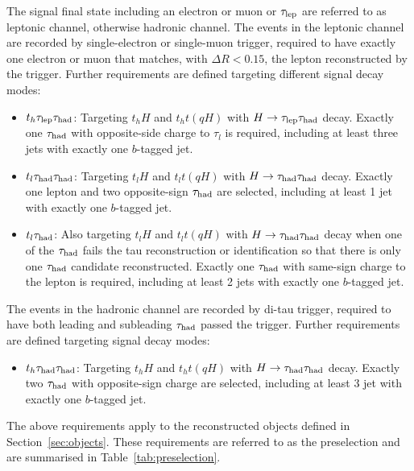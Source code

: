The signal final state including an electron or muon or $\tau_{\mathrm{lep}}$ are referred to as leptonic channel, otherwise hadronic channel.
The events in the leptonic channel are recorded by single-electron or single-muon trigger, required to have exactly one electron or muon that matches, with $\Delta R < 0.15$, the lepton reconstructed by the trigger. Further requirements are defined targeting different signal decay modes:  
\begin{itemize}
\item $t_h\tau_{\mathrm{lep}} \tau_{\mathrm{had}}$: Targeting $t_hH$ and $t_ht(qH)$ with $H\to\tau_{\mathrm{lep}} \tau_{\mathrm{had}}$ decay. Exactly one $\tau_{\mathrm{had}}$ with opposite-side charge to $\tau_l$ is required, including at least three jets with exactly one $b$-tagged jet.
\item $t_l\tau_{\mathrm{had}} \tau_{\mathrm{had}}$: Targeting $t_lH$ and $t_lt(qH)$ with $H\to\tau_{\mathrm{had}} \tau_{\mathrm{had}}$ decay. Exactly one lepton and two opposite-sign $\tau_{\mathrm{had}}$ are selected, including at least 1 jet with exactly one $b$-tagged jet.
\item $t_l\tau_{\mathrm{had}}$: Also targeting $t_lH$ and $t_lt(qH)$ with $H\to\tau_{\mathrm{had}} \tau_{\mathrm{had}}$ decay when one of the $\tau_{\mathrm{had}}$ fails the tau reconstruction or identification so that there is only
  one $\tau_{\mathrm{had}}$ candidate reconstructed. Exactly one $\tau_{\mathrm{had}}$ with same-sign charge to the lepton is required, including at least 2 jets with exactly one $b$-tagged jet.
\end{itemize}

The events in the hadronic channel are recorded by di-tau trigger, required to have both leading and subleading $\tau_{\mathrm{had}}$ passed the trigger. Further requirements are defined targeting signal decay modes:
\begin{itemize}
\item $t_h\tau_{\mathrm{had}} \tau_{\mathrm{had}}$: Targeting $t_hH$ and $t_ht(qH)$ with $H\to\tau_{\mathrm{had}} \tau_{\mathrm{had}}$ decay. Exactly two $\tau_{\mathrm{had}}$ with opposite-sign charge are selected, including at least 3 jet with exactly one $b$-tagged jet.
\end{itemize}

The above requirements apply to the reconstructed objects defined in Section~\ref{sec:objects}.
These requirements are referred to as the preselection and are summarised in Table~\ref{tab:preselection}. 


